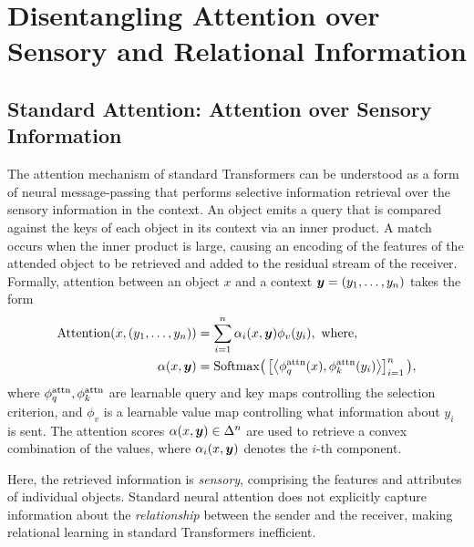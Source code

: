 \section{Disentangling Attention over Sensory and Relational Information}

\subsection{Standard Attention: Attention over Sensory Information}

The attention mechanism of standard Transformers can be understood as a form of neural message-passing that performs selective information retrieval over the sensory information in the context. An object emits a query that is compared against the keys of each object in its context via an inner product. A match occurs when the inner product is large, causing an encoding of the features of the attended object to be retrieved and added to the residual stream of the receiver. Formally, attention between an object $x$ and a context $\bm{y} = (y_1, \ldots, y_n)$ takes the form
\begin{equation}\label{eq:self_attn}
  \begin{split}
    \Attn(x, \ys) &= \sum_{i=1}^{n} \alpha_i(x, \y) \phi_v(y_i), \ \text{where}, \\
    \alpha(x, \y) &= \Softmax\bigparen{\bra{\iprod{\phiqattn(x)}{\phikattn(y_i)}}_{i=1}^{n}},
  \end{split}
\end{equation}
where $\phi_q^{\mathrm{attn}},\phi_k^{\mathrm{attn}}$ are learnable query and key maps controlling the selection criterion, and $\phi_v$ is a learnable value map controlling what information about $y_i$ is sent. The attention scores $\alpha(x, \bm{y}) \in \Delta^n$ are used to retrieve a convex combination of the values, where $\alpha_i(x, \bm{y})$ denotes the $i$-th component.

Here, the retrieved information is \textit{sensory}, comprising the features and attributes of individual objects. Standard neural attention does not explicitly capture information about the \textit{relationship} between the sender and the receiver, making relational learning in standard Transformers inefficient.



